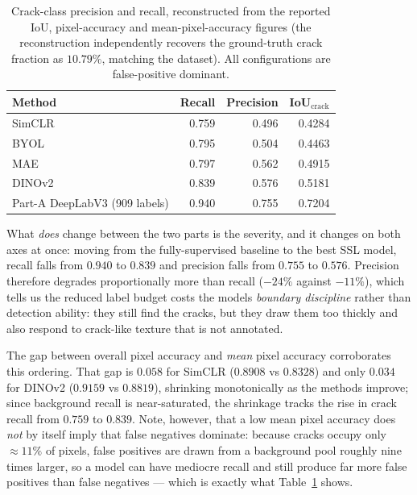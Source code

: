 \documentclass[conference]{IEEEtran}
\begin{document}
\begin{table}[t]
\caption{Crack-class precision and recall, reconstructed from the reported IoU,
pixel-accuracy and mean-pixel-accuracy figures (the reconstruction independently
recovers the ground-truth crack fraction as $10.79\%$, matching the dataset).
All configurations are false-positive dominant.}
\label{tab:pr}
\centering
\small
\begin{tabular}{@{}lrrr@{}}
\toprule
\textbf{Method} & \textbf{Recall} & \textbf{Precision} & \textbf{IoU$_{\text{crack}}$} \\
\midrule
SimCLR                  & 0.759 & 0.496 & 0.4284 \\
BYOL                    & 0.795 & 0.504 & 0.4463 \\
MAE                     & 0.797 & 0.562 & 0.4915 \\
DINOv2                  & 0.839 & 0.576 & 0.5181 \\
\midrule
Part-A DeepLabV3 (909 labels) & 0.940 & 0.755 & 0.7204 \\
\bottomrule
\end{tabular}
\end{table}

What \emph{does} change between the two parts is the severity, and it changes on both
axes at once: moving from the fully-supervised baseline to the best SSL model, recall
falls from $0.940$ to $0.839$ and precision falls from $0.755$ to $0.576$. Precision
therefore degrades proportionally more than recall ($-24\%$ against $-11\%$), which
tells us the reduced label budget costs the models \emph{boundary discipline} rather
than detection ability: they still find the cracks, but they draw them too thickly and
also respond to crack-like texture that is not annotated.

The gap between overall pixel accuracy and \emph{mean} pixel accuracy corroborates
this ordering. That gap is $0.058$ for SimCLR ($0.8908$ vs $0.8328$) and only $0.034$
for DINOv2 ($0.9159$ vs $0.8819$), shrinking monotonically as the methods improve;
since background recall is near-saturated, the shrinkage tracks the rise in crack
recall from $0.759$ to $0.839$. Note, however, that a low mean pixel accuracy does
\emph{not} by itself imply that false negatives dominate: because cracks occupy only
$\approx 11\%$ of pixels, false positives are drawn from a background pool roughly
nine times larger, so a model can have mediocre recall and still produce far more
false positives than false negatives --- which is exactly what
Table~\ref{tab:pr} shows.
\end{document}
